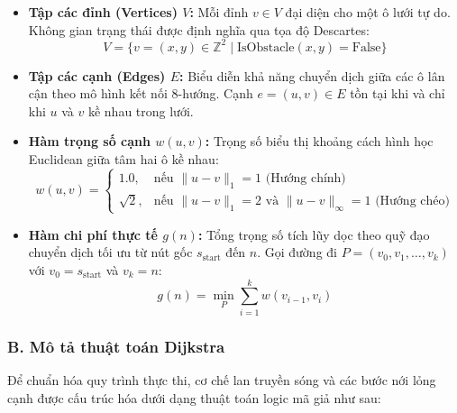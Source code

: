 \documentclass[a4paper, 12pt]{report}
\begin{document}
  \begin{itemize}
      \item \textbf{Tập các đỉnh (Vertices) $V$:} Mỗi đỉnh $v \in V$ đại diện cho một ô lưới tự do. Không gian trạng thái được định nghĩa qua tọa độ Descartes:
      $$V = \{v = (x, y) \in \mathbb{Z}^2 \mid \text{IsObstacle}(x, y) = \text{False}\}$$
      
      \item \textbf{Tập các cạnh (Edges) $E$:} Biểu diễn khả năng chuyển dịch giữa các ô lân cận theo mô hình kết nối $8$-hướng. Cạnh $e = (u, v) \in E$ tồn tại khi và chỉ khi $u$ và $v$ kề nhau trong lưới.
      
      \item \textbf{Hàm trọng số cạnh $w(u, v)$:} Trọng số biểu thị khoảng cách hình học Euclidean giữa tâm hai ô kề nhau:
      $$w(u, v) = \begin{cases} 
        1.0, & \text{nếu } \|u - v\|_1 = 1 \text{ (Hướng chính)} \\
        \sqrt{2}, & \text{nếu } \|u - v\|_1 = 2 \text{ và } \|u - v\|_\infty = 1 \text{ (Hướng chéo)}
     \end{cases}$$
     
      \item \textbf{Hàm chi phí thực tế $g(n)$:} Tổng trọng số tích lũy dọc theo quỹ đạo chuyển dịch tối ưu từ nút gốc $s_{\text{start}}$ đến $n$. Gọi đường đi $P = (v_0, v_1, \dots, v_k)$ với $v_0 = s_{\text{start}}$ và $v_k = n$:
      $$g(n) = \min_{P} \sum_{i=1}^{k} w(v_{i-1}, v_{i})$$
  \end{itemize}

  \subsubsection{B. Mô tả thuật toán Dijkstra}

  Để chuẩn hóa quy trình thực thi, cơ chế lan truyền sóng và các bước nới lỏng cạnh được cấu trúc hóa dưới dạng thuật toán logic mã giả như sau:
\end{document}
